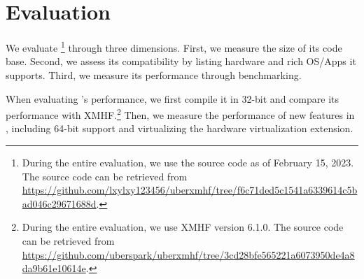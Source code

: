 \chapter{Evaluation}
\label{sec:evaluation}

We evaluate \footnote{During the entire evaluation, we use the  source code as of February 15, 2023. The source code can be retrieved from \url{https://github.com/lxylxy123456/uberxmhf/tree/f6c71ded5c1541a6339614c5bad046c29671688d}.} through three dimensions. First, we measure the size of its code base. Second, we assess its compatibility by listing hardware and rich OS/Apps it supports. Third, we measure its performance through benchmarking.

When evaluating 's performance, we first compile it in 32-bit and compare its performance with XMHF.\footnote{During the entire evaluation, we use XMHF version 6.1.0. The source code can be retrieved from \url{https://github.com/uberspark/uberxmhf/tree/3cd28bfe565221a6073950de4a8da9b61e10614e}.} Then, we measure the performance of new features in , including 64-bit support and virtualizing the hardware virtualization extension.






